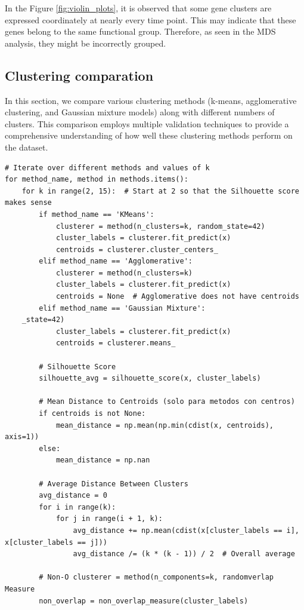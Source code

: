 \documentclass{article}
\begin{document}
In the Figure \ref{fig:violin_plots}, it is observed that some gene clusters are expressed coordinately at nearly every time point. This may indicate that these genes belong to the same functional group. Therefore, as seen in the MDS analysis, they might be incorrectly grouped. 

\subsection{Clustering comparation}

In this section, we compare various clustering methods (k-means, agglomerative clustering, and Gaussian mixture models) along with different numbers of clusters. This comparison employs multiple validation techniques to provide a comprehensive understanding of how well these clustering methods perform on the dataset. 

\begin{lstlisting}[style=mypython, caption=Clustering Metrics Across Different Methods, label=lst:violin]
# Iterate over different methods and values of k
for method_name, method in methods.items():
	for k in range(2, 15):  # Start at 2 so that the Silhouette score makes sense
		if method_name == 'KMeans':
			clusterer = method(n_clusters=k, random_state=42)
			cluster_labels = clusterer.fit_predict(x)
			centroids = clusterer.cluster_centers_
		elif method_name == 'Agglomerative':
			clusterer = method(n_clusters=k)
			cluster_labels = clusterer.fit_predict(x)
			centroids = None  # Agglomerative does not have centroids
		elif method_name == 'Gaussian Mixture':
	_state=42)
			cluster_labels = clusterer.fit_predict(x)
			centroids = clusterer.means_
			
		# Silhouette Score
		silhouette_avg = silhouette_score(x, cluster_labels)
		
		# Mean Distance to Centroids (solo para metodos con centros)
		if centroids is not None:
			mean_distance = np.mean(np.min(cdist(x, centroids), axis=1))
		else:
			mean_distance = np.nan
		
		# Average Distance Between Clusters
		avg_distance = 0
		for i in range(k):
			for j in range(i + 1, k):
				avg_distance += np.mean(cdist(x[cluster_labels == i], x[cluster_labels == j]))
				avg_distance /= (k * (k - 1)) / 2  # Overall average
		
		# Non-O	clusterer = method(n_components=k, randomverlap Measure
		non_overlap = non_overlap_measure(cluster_labels)

\end{lstlisting}
\end{document}
